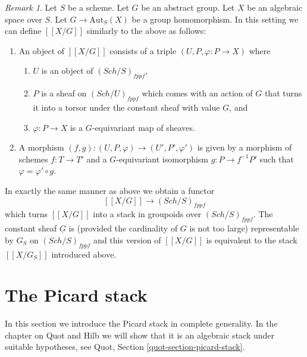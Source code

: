 \documentclass{stacks-project}
\theoremstyle{plain}
\theoremstyle{definition}
\theoremstyle{remark}
\newtheorem{remark}[subsection]{Remark}
\numberwithin{equation}{subsection}
\def\Sch{\mathit{Sch}}
\begin{document}
\begin{remark}
\label{remark-X-mod-G-group}
Let $S$ be a scheme.
Let $G$ be an abstract group.
Let $X$ be an algebraic space over $S$.
Let $G \to \text{Aut}_S(X)$ be a group homomorphism.
In this setting we can define $[[X/G]]$ similarly
to the above as follows:
\begin{enumerate}
\item An object of $[[X/G]]$ consists of a triple
$(U, P, \varphi : P \to X)$ where
\begin{enumerate}
\item $U$ is an object of $(\Sch/S)_{fppf}$,
\item $P$ is a sheaf on $(\Sch/U)_{fppf}$ which comes
with an action of $G$ that turns it into a torsor under the constant
sheaf with value $G$, and
\item $\varphi : P \to X$ is a $G$-equivariant map of sheaves.
\end{enumerate}
\item A morphism
$(f, g) : (U, P, \varphi) \to (U', P', \varphi')$
is given by a morphism of schemes $f : T \to T'$
and a $G$-equivariant isomorphism
$g : P \to f^{-1}P'$ such that $\varphi = \varphi' \circ g$.
\end{enumerate}
In exactly the same manner as above we obtain a functor
$$
[[X/G]] \longrightarrow (\Sch/S)_{fppf}
$$
which turns $[[X/G]]$ into a stack in groupoids over $(\Sch/S)_{fppf}$.
The constant sheaf $\underline{G}$ is (provided the cardinality of $G$ is
not too large) representable by $G_S$ on $(\Sch/S)_{fppf}$
and this version of $[[X/G]]$ is equivalent to the stack
$[[X/G_S]]$ introduced above.
\end{remark}






\section{The Picard stack}
\label{section-picard-stack}

\noindent
In this section we introduce the Picard stack in complete generality.
In the chapter on Quot and Hilb we will show that it is an algebraic
stack under suitable hypotheses, see
Quot, Section \ref{quot-section-picard-stack}.
\end{document}

